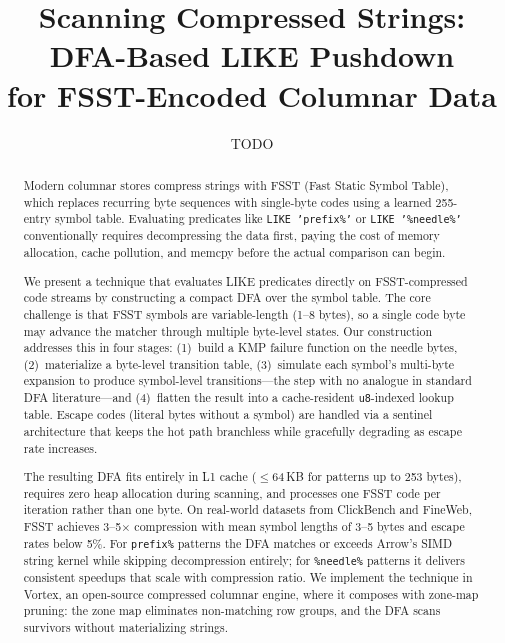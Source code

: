 \documentclass[sigconf,nonacm]{acmart}
\begin{document}
\title{Scanning Compressed Strings: DFA-Based LIKE Pushdown\\for FSST-Encoded Columnar Data}

\author{TODO}


\begin{abstract}
Modern columnar stores compress strings with FSST (Fast Static Symbol Table),
which replaces recurring byte sequences with single-byte codes using a learned
255-entry symbol table. Evaluating predicates like \texttt{LIKE~'prefix\%'} or
\texttt{LIKE~'\%needle\%'} conventionally requires decompressing the data first,
paying the cost of memory allocation, cache pollution, and memcpy before the
actual comparison can begin.

We present a technique that evaluates LIKE predicates directly on
FSST-compressed code streams by constructing a compact DFA over the symbol
table. The core challenge is that FSST symbols are variable-length (1--8 bytes),
so a single code byte may advance the matcher through multiple byte-level
states. Our construction addresses this in four stages: (1)~build a KMP failure
function on the needle bytes, (2)~materialize a byte-level transition table,
(3)~simulate each symbol's multi-byte expansion to produce symbol-level
transitions---the step with no analogue in standard DFA literature---and
(4)~flatten the result into a cache-resident \texttt{u8}-indexed lookup table.
Escape codes (literal bytes without a symbol) are handled via a sentinel
architecture that keeps the hot path branchless while gracefully degrading as
escape rate increases.

The resulting DFA fits entirely in L1 cache ($\leq$64\,KB for patterns up to
253 bytes), requires zero heap allocation during scanning, and processes one
FSST code per iteration rather than one byte. On real-world datasets from
ClickBench and FineWeb, FSST achieves 3--5$\times$ compression with mean symbol
lengths of 3--5 bytes and escape rates below 5\%. For \texttt{prefix\%}
patterns the DFA matches or exceeds Arrow's SIMD string kernel while skipping
decompression entirely; for \texttt{\%needle\%} patterns it delivers consistent
speedups that scale with compression ratio. We implement the technique in
Vortex, an open-source compressed columnar engine, where it composes with
zone-map pruning: the zone map eliminates non-matching row groups, and the DFA
scans survivors without materializing strings.
\end{abstract}
\end{document}
